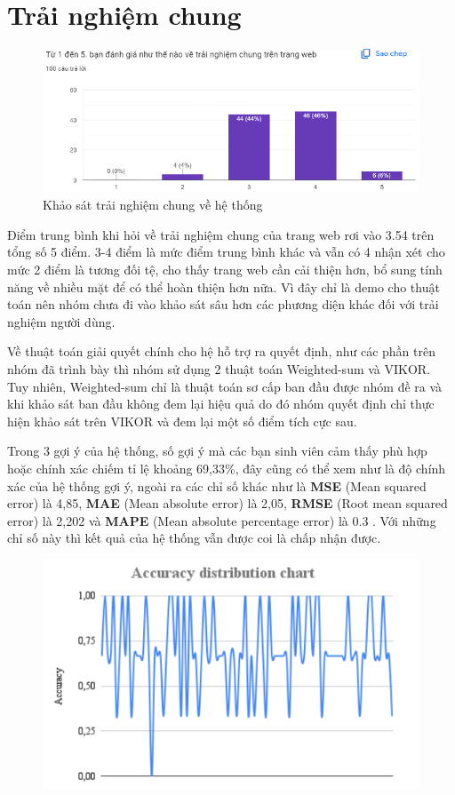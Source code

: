 \section{Trải nghiệm chung}

\begin{figure}[H]
    \centering
    \includegraphics[width=0.8\linewidth]{images/survey1.png}
    \vspace{0.6cm}
    \caption{Khảo sát trải nghiệm chung về hệ thống}
\end{figure}

Điểm trung bình khi hỏi về trải nghiệm chung của trang web rơi vào 3.54 trên tổng số 5 điểm. 3-4 điểm là mức điểm trung bình khác và vẫn có 4 nhận xét cho mức 2 điểm là tương đối tệ, cho thấy trang web cần cải thiện hơn, bổ sung tính năng về nhiều mặt để có thể hoàn thiện hơn nữa. Vì đây chỉ là demo cho thuật toán nên nhóm chưa đi vào khảo sát sâu hơn các phương diện khác đối với trải nghiệm người dùng. 

Về thuật toán giải quyết chính cho hệ hỗ trợ ra quyết định, như các phần trên nhóm đã trình bày thì nhóm sử dụng 2 thuật toán Weighted-sum và VIKOR. Tuy nhiên, Weighted-sum chỉ là thuật toán sơ cấp ban đầu được nhóm đề ra và khi khảo sát ban đầu không đem lại hiệu quả do đó nhóm quyết định chỉ thực hiện khảo sát trên VIKOR và đem lại một số điểm tích cực sau. 

Trong 3 gợi ý của hệ thống, số gợi ý mà các bạn sinh viên cảm thấy phù hợp hoặc chính xác chiếm tỉ lệ khoảng 69,33\%, đây cũng có thể xem như là độ chính xác của hệ thống gợi ý, ngoài ra các chỉ số khác như là \textbf{MSE} (Mean squared error) là 4,85, \textbf{MAE} (Mean absolute error) là 2,05, \textbf{RMSE} (Root mean squared error) là 2,202 và \textbf{MAPE} (Mean absolute percentage error) là 0.3 \cite{thu}. Với những chỉ số này thì kết quả của hệ thống vẫn được coi là chấp nhận được.
\begin{figure}[H]
    \centering
    \includegraphics[width=0.6\linewidth]{images/accChart.png}
\end{figure}


